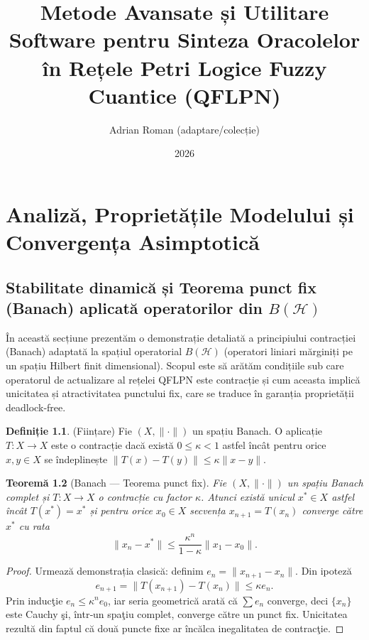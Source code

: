\documentclass[12pt,a4paper]{report}
\newtheorem{theorem}{Teoremă}[chapter]
\theoremstyle{definition}
\newtheorem{definition}[theorem]{Definiție}
\theoremstyle{remark}
\begin{document}
\title{Metode Avansate și Utilitare Software pentru Sinteza Oracolelor în Rețele Petri Logice Fuzzy Cuantice (QFLPN)}
\author{Adrian Roman (adaptare/colecție)}
\date{2026}
\maketitle

\tableofcontents
\clearpage


\chapter{Analiză, Proprietățile Modelului și Convergența Asimptotică}

\section{Stabilitate dinamică și Teorema punct fix (Banach) aplicată operatorilor din $B(\mathcal{H})$}

În această secțiune prezentăm o demonstrație detaliată a principiului contracției (Banach) adaptată la spațiul operatorial $B(\mathcal{H})$ (operatori liniari mărginiți pe un spațiu Hilbert finit dimensional). Scopul este să arătăm condițiile sub care operatorul de actualizare al rețelei QFLPN este contracție și cum aceasta implică unicitatea și atractivitatea punctului fix, care se traduce în garanția proprietății deadlock‑free.

\begin{definition}
(Ființare) Fie $(X,\|\cdot\|)$ un spațiu Banach. O aplicație $T:X\to X$ este o contracție dacă există $0\le\kappa<1$ astfel încât pentru orice $x,y\in X$ se îndeplinește $\|T(x)-T(y)\|\le\kappa\|x-y\|$.
\end{definition}

\begin{theorem}[Banach — Teorema punct fix]
Fie $(X,\|\cdot\|)$ un spațiu Banach complet și $T:X\to X$ o contracție cu factor $\kappa$. Atunci există unicul $x^{*}\in X$ astfel încât $T(x^{*})=x^{*}$ și pentru orice $x_0\in X$ secvența $x_{n+1}=T(x_n)$ converge către $x^{*}$ cu rata
\begin{equation}
\|x_n-x^{*}\|\le\frac{\kappa^{n}}{1-\kappa}\|x_1-x_0\|.
\end{equation}
\end{theorem}

\begin{proof}
Urmează demonstrația clasică: definim $e_n=\|x_{n+1}-x_n\|$. Din ipoteză
\[ e_{n+1}=\|T(x_{n+1})-T(x_n)\|\le\kappa e_n. \]
Prin inducţie $e_n\le\kappa^{n}e_0$, iar seria geometrică arată că $\sum e_n$ converge, deci $\{x_n\}$ este Cauchy şi, într‑un spaţiu complet, converge către un punct fix. Unicitatea rezultă din faptul că două puncte fixe ar încălca inegalitatea de contracţie.
\end{proof}
\end{document}
